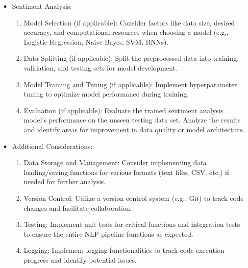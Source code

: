 \documentclass[12pt,a4paper,titlepage]{report}
\begin{document}
\begin{itemize}
\begin{enumerate}
		\end{enumerate}
		
		\item Sentiment Analysis:
		\begin{enumerate}
			\item  Model Selection (if applicable):
			Consider factors like data size, desired accuracy, and computational
			resources when choosing a model (e.g., Logistic Regression, Naive
			Bayes, SVM, RNNs).
			\item Data Splitting (if applicable):
			Split the preprocessed data into training, validation, and testing sets for
			model development.
			
			\item Model Training and Tuning (if applicable):
			Implement hyperparameter tuning to optimize model performance
			during training.
			\item Evaluation (if applicable):
			Evaluate the trained sentiment analysis model's performance on the unseen testing data set.
			Analyze the results and identify areas for improvement in data quality
			or model architecture.
		\end{enumerate}
		
		\item Additional Considerations:
		\begin{enumerate}
			\item  Data Storage and Management: Consider implementing data loading/saving
			functions for various formats (text files, CSV, etc.) if needed for further
			analysis.
			\item Version Control: Utilize a version control system (e.g., Git) to track code
			changes and facilitate collaboration.
			\item Testing: Implement unit tests for critical functions and integration tests to
			ensure the entire NLP pipeline functions as expected.
			\item Logging: Implement logging functionalities to track code execution progress
			and identify potential issues.
		\end{enumerate}
		
	\end{itemize}
	
\end{document}
